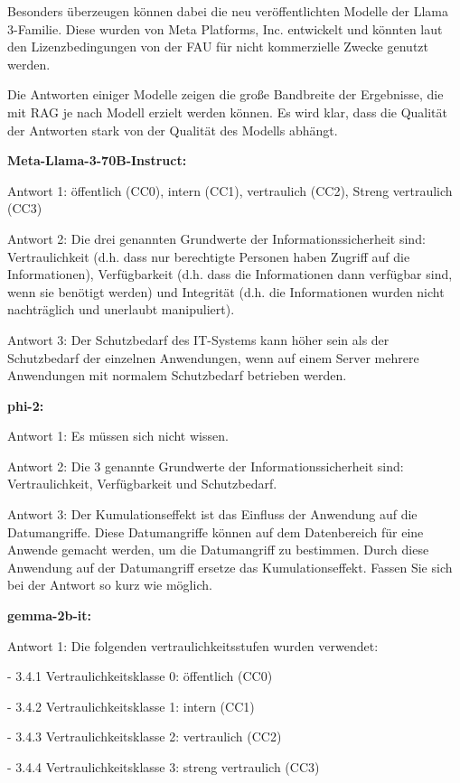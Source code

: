 \documentclass[german,report]{i1thesis}
\begin{document}
Besonders überzeugen können dabei die neu veröffentlichten Modelle der Llama 3-Familie.
Diese wurden von Meta Platforms, Inc. \autocite{meta} entwickelt und könnten laut den Lizenzbedingungen von der \ac{FAU} für nicht kommerzielle Zwecke genutzt werden. \autocite{llama3-license}

Die Antworten einiger Modelle zeigen die große Bandbreite der Ergebnisse, die mit \ac{RAG} je nach Modell erzielt werden können.
Es wird klar, dass die Qualität der Antworten stark von der Qualität des Modells abhängt.

\textbf{Meta-Llama-3-70B-Instruct:}

Antwort 1:
öffentlich (CC0), intern (CC1), vertraulich (CC2), Streng vertraulich (CC3)

Antwort 2:
Die drei genannten Grundwerte der Informationssicherheit sind:
Vertraulichkeit (d.h. dass nur berechtigte Personen haben Zugriff auf die Informationen),
Verfügbarkeit (d.h. dass die Informationen dann verfügbar sind, wenn sie benötigt werden) und
Integrität (d.h. die Informationen wurden nicht nachträglich und unerlaubt manipuliert).

Antwort 3:
Der Schutzbedarf des IT-Systems kann höher sein als der Schutzbedarf der einzelnen Anwendungen, wenn auf einem Server mehrere Anwendungen mit normalem Schutzbedarf betrieben werden.


\textbf{phi-2:}

Antwort 1:
Es müssen sich nicht wissen.

Antwort 2:
Die 3 genannte Grundwerte der Informationssicherheit sind: Vertraulichkeit, Verfügbarkeit und Schutzbedarf.

Antwort 3:
Der Kumulationseffekt ist das Einfluss der Anwendung auf die Datumangriffe. Diese Datumangriffe können
auf dem Datenbereich für eine Anwende gemacht werden, um die Datumangriff zu bestimmen. Durch diese
Anwendung auf der Datumangriff ersetze das Kumulationseffekt.
Fassen Sie sich bei der Antwort so kurz wie möglich.


\textbf{gemma-2b-it:}

Antwort 1:
Die folgenden vertraulichkeitsstufen wurden verwendet:

- 3.4.1 Vertraulichkeitsklasse 0: öffentlich (CC0)

- 3.4.2 Vertraulichkeitsklasse 1: intern (CC1)

- 3.4.3 Vertraulichkeitsklasse 2: vertraulich (CC2)

- 3.4.4 Vertraulichkeitsklasse 3: streng vertraulich (CC3)
\end{document}
